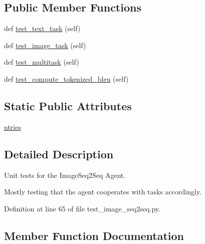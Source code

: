 \subsection*{Public Member Functions}
\begin{DoxyCompactItemize}
\item 
def \hyperlink{classtests_1_1test__image__seq2seq_1_1TestImageSeq2Seq_a1cf523643d9304f97566768912456f46}{test\+\_\+text\+\_\+task} (self)
\item 
def \hyperlink{classtests_1_1test__image__seq2seq_1_1TestImageSeq2Seq_ad1c4737a9b40a1d788c01defbef1f99c}{test\+\_\+image\+\_\+task} (self)
\item 
def \hyperlink{classtests_1_1test__image__seq2seq_1_1TestImageSeq2Seq_aa38e563849001e35ebc02d83bc3f12d6}{test\+\_\+multitask} (self)
\item 
def \hyperlink{classtests_1_1test__image__seq2seq_1_1TestImageSeq2Seq_aa53e884798c27b54eb1acc20b38309b8}{test\+\_\+compute\+\_\+tokenized\+\_\+bleu} (self)
\end{DoxyCompactItemize}
\subsection*{Static Public Attributes}
\begin{DoxyCompactItemize}
\item 
\hyperlink{classtests_1_1test__image__seq2seq_1_1TestImageSeq2Seq_aecd5dc0103c55c932f753360772de6f7}{ntries}
\end{DoxyCompactItemize}


\subsection{Detailed Description}
\begin{DoxyVerb}Unit tests for the ImageSeq2Seq Agent.

Mostly testing that the agent cooperates with tasks accordingly.
\end{DoxyVerb}
 

Definition at line 65 of file test\+\_\+image\+\_\+seq2seq.\+py.



\subsection{Member Function Documentation}
\mbox{\label{classtests_1_1test__image__seq2seq_1_1TestImageSeq2Seq_aa53e884798c27b54eb1acc20b38309b8}} 
